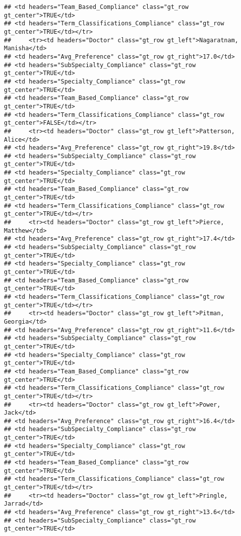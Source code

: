 \documentclass[
]{article}
\begin{document}
\begin{verbatim}
## <td headers="Team_Based_Compliance" class="gt_row gt_center">TRUE</td>
## <td headers="Term_Classifications_Compliance" class="gt_row gt_center">TRUE</td></tr>
##     <tr><td headers="Doctor" class="gt_row gt_left">Nagaratnam, Manisha</td>
## <td headers="Avg_Preference" class="gt_row gt_right">17.0</td>
## <td headers="SubSpecialty_Compliance" class="gt_row gt_center">TRUE</td>
## <td headers="Specialty_Compliance" class="gt_row gt_center">TRUE</td>
## <td headers="Team_Based_Compliance" class="gt_row gt_center">TRUE</td>
## <td headers="Term_Classifications_Compliance" class="gt_row gt_center">FALSE</td></tr>
##     <tr><td headers="Doctor" class="gt_row gt_left">Patterson, Alice</td>
## <td headers="Avg_Preference" class="gt_row gt_right">19.8</td>
## <td headers="SubSpecialty_Compliance" class="gt_row gt_center">TRUE</td>
## <td headers="Specialty_Compliance" class="gt_row gt_center">TRUE</td>
## <td headers="Team_Based_Compliance" class="gt_row gt_center">TRUE</td>
## <td headers="Term_Classifications_Compliance" class="gt_row gt_center">TRUE</td></tr>
##     <tr><td headers="Doctor" class="gt_row gt_left">Pierce, Matthew</td>
## <td headers="Avg_Preference" class="gt_row gt_right">17.4</td>
## <td headers="SubSpecialty_Compliance" class="gt_row gt_center">TRUE</td>
## <td headers="Specialty_Compliance" class="gt_row gt_center">TRUE</td>
## <td headers="Team_Based_Compliance" class="gt_row gt_center">TRUE</td>
## <td headers="Term_Classifications_Compliance" class="gt_row gt_center">TRUE</td></tr>
##     <tr><td headers="Doctor" class="gt_row gt_left">Pitman, Georgia</td>
## <td headers="Avg_Preference" class="gt_row gt_right">11.6</td>
## <td headers="SubSpecialty_Compliance" class="gt_row gt_center">TRUE</td>
## <td headers="Specialty_Compliance" class="gt_row gt_center">TRUE</td>
## <td headers="Team_Based_Compliance" class="gt_row gt_center">TRUE</td>
## <td headers="Term_Classifications_Compliance" class="gt_row gt_center">TRUE</td></tr>
##     <tr><td headers="Doctor" class="gt_row gt_left">Power, Jack</td>
## <td headers="Avg_Preference" class="gt_row gt_right">16.4</td>
## <td headers="SubSpecialty_Compliance" class="gt_row gt_center">TRUE</td>
## <td headers="Specialty_Compliance" class="gt_row gt_center">TRUE</td>
## <td headers="Team_Based_Compliance" class="gt_row gt_center">TRUE</td>
## <td headers="Term_Classifications_Compliance" class="gt_row gt_center">TRUE</td></tr>
##     <tr><td headers="Doctor" class="gt_row gt_left">Pringle, Jarrad</td>
## <td headers="Avg_Preference" class="gt_row gt_right">13.6</td>
## <td headers="SubSpecialty_Compliance" class="gt_row gt_center">TRUE</td>

\end{verbatim}
\end{document}
